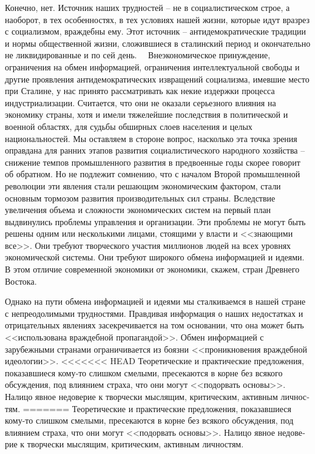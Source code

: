 \documentclass{book}
\begin{document}
Конечно, нет. Источник наших трудностей -- не в социалистическом строе, а наоборот, в тех особенностях, в тех условиях нашей 
жизни, которые идут вразрез с социализмом, враждебны ему. Этот источник -- антидемократические традиции и нормы общественной 
жизни, сложившиеся в сталинский период и окончательно не ликвидированные и по сей день.   Внеэкономическое принуждение, 
ограничения на обмен информацией, ограничения интеллектуальной свободы и другие проявления антидемократических извращений 
социализма, имевшие место при Сталине, у нас принято рассматривать как некие издержки процесса индустриализации. Считается, что 
они не оказали серьезного влияния на экономику страны, хотя и имели тяже­лейшие последствия в политической и военной областях, 
для судьбы обширных слоев населения и целых национальностей. Мы оставляем в стороне вопрос, насколько эта точка зрения оправдана 
для ранних этапов развития социалистического народ­ного хозяйства -- снижение темпов промышленного развития в предвоенные годы 
скорее говорит об обратном. Но не подле­жит сомнению, что с началом Второй промышленной револю­ции эти явления стали решающим 
экономическим фактором, стали основным тормозом развития производительных сил страны. Вследствие увеличения объема и сложности 
экономи­ческих систем на первый план выдвинулись проблемы управ­ления и организации. Эти проблемы не могут быть решены одним или 
несколькими лицами, стоящими у власти и <<знаю­щими все>>. Они требуют творческого участия миллионов людей на всех уровнях 
экономической системы. Они требуют широ­кого обмена информацией и идеями. В этом отличие современ­ной экономики от экономики, 
скажем, стран Древнего Востока.

Однако на пути обмена информацией и идеями мы сталки­ваемся в нашей стране с непреодолимыми трудностями. Прав­дивая информация о 
наших недостатках и отрицательных явле­ниях засекречивается на том основании, что она может быть <<использована враждебной 
пропагандой>>. Обмен информацией с зарубежными странами ограничивается из боязни <<проникно­вения враждебной идеологии>>. 
<<<<<<< HEAD
Теоретические и практические предложения, показавшиеся кому‑то слишком смелыми, пресе­каются в корне без всякого обсуждения, под 
влиянием стра­ха, что они могут <<подорвать основы>>. Налицо явное недове­рие к творчески мыслящим, критическим, активным личнос­тям. 
=======
Теоретические и практические предложения, показавшиеся кому-то слишком смелыми, пресе­каются в корне без всякого обсуждения, под 
влиянием стра­ха, что они могут <<подорвать основы>>. Налицо явное недове­рие к творчески мыслящим, критическим, активным личнос­тям. 
\end{document}
